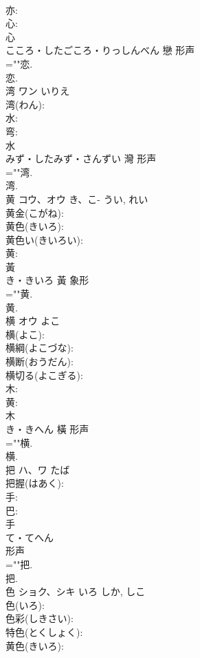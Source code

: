 \documentclass[8pt]{extreport}
\begin{document}
\begin{CJK}{UTF8}{min}
\\	亦: 
\\	心: 
\\	心	
\\	こころ・したごころ・りっしんべん	戀	形声 
\\	=""恋.
\\	恋.
\\	湾	ワン	いりえ		
\\	湾(わん): 
\\	水: 
\\	弯: 
\\	水	
\\	みず・したみず・さんずい	灣	形声 
\\	=""湾.
\\	湾.
\\	黄	コウ、オウ	き、こ-	うい, れい	
\\	黄金(こがね): 
\\	黄色(きいろ): 
\\	黄色い(きいろい): 
\\	黄: 
\\	黃	
\\	き・きいろ	黃	象形 
\\	=""黄.
\\	黄.
\\	横	オウ	よこ		
\\	横(よこ): 
\\	横綱(よこづな): 
\\	横断(おうだん): 
\\	横切る(よこぎる): 
\\	木: 
\\	黄: 
\\	木	
\\	き・きへん	橫	形声 
\\	=""横.
\\	横.
\\	把	ハ、ワ		たば	
\\	把握(はあく): 
\\	手: 
\\	巴: 
\\	手	
\\	て・てへん	
\\	形声 
\\	=""把.
\\	把.
\\	色	ショク、シキ	いろ	しか, しこ	
\\	色(いろ): 
\\	色彩(しきさい): 
\\	特色(とくしょく): 
\\	黄色(きいろ): 

\end{CJK}
\end{document}
